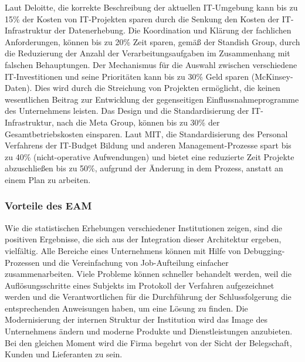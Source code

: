 \documentclass[doc]{apa6}
\begin{document}
Laut Deloitte, die  korrekte Beschreibung der aktuellen IT-Umgebung kann bis zu 15\% der Kosten von IT-Projekten sparen durch  die Senkung den Kosten der IT-Infrastruktur der Datenerhebung. Die Koordination und Klärung der fachlichen Anforderungen, können bis zu 20\%  Zeit  sparen, gemäß der Standish Group, durch die Reduzierung der Anzahl der Verarbeitungsaufgaben im Zusammenhang mit falschen Behauptungen. Der Mechanismus für die Auswahl zwischen verschiedene  IT-Investitionen und seine  Prioritäten  kann bis zu 30\% Geld sparen (McKinsey-Daten). Dies wird durch die Streichung von Projekten ermöglicht, die keinen wesentlichen Beitrag zur Entwicklung der gegenseitigen Einflussnahmeprogramme des Unternehmens leisten. Das Design und die Standardisierung der IT-Infrastruktur, nach die Meta Group, können bis zu 30\% der Gesamtbetriebskosten einsparen. Laut MIT, die Standardisierung des Personal Verfahrens der IT-Budget Bildung und anderen Management-Prozesse spart bis zu 40\% (nicht-operative Aufwendungen) und bietet eine reduzierte Zeit Projekte abzuschließen bis zu 50\%, aufgrund der Änderung in dem Prozess, anstatt an einem Plan zu arbeiten.

\subsubsection{Vorteile des EAM}
Wie die statistischen Erhebungen verschiedener Institutionen zeigen, sind die positiven Ergebnisse, die sich aus der Integration dieser Architektur ergeben, vielfältig. Alle Bereiche eines Unternehmens können mit Hilfe von Debugging-Prozessen und die Vereinfachung von Job-Aufteilung einfacher zusammenarbeiten. Viele Probleme können schneller behandelt werden, weil die Auflösungsschritte eines Subjekts im Protokoll der Verfahren aufgezeichnet werden und die Verantwortlichen für die Durchführung der Schlussfolgerung die entsprechenden Anweisungen haben, um eine Lösung zu finden. Die Modernisierung der internen Struktur der Institution wird das Image des Unternehmens ändern und moderne Produkte und Dienstleistungen anzubieten. Bei den gleichen Moment wird die Firma begehrt von der Sicht der Belegschaft, Kunden und Lieferanten zu sein.
\end{document}
